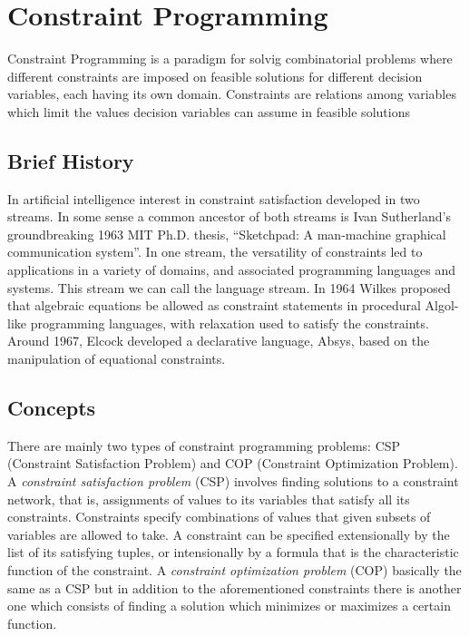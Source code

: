 \section{Constraint Programming}\label{sec:constraint_programming}

Constraint Programming is a paradigm for solvig combinatorial problems where
different constraints are imposed on feasible solutions for different decision variables, each having
its own domain. Constraints are relations among variables which limit the values decision variables
can assume in feasible solutions \cite{10.5555/2843512}

\subsection{Brief History}\label{subsec:brief_history}
In artificial intelligence interest in constraint satisfaction developed in two streams. In
some sense a common ancestor of both streams is Ivan Sutherland’s groundbreaking 1963
MIT Ph.D. thesis, “Sketchpad: A man-machine graphical communication system”.
In one stream, the versatility of constraints led to applications in a variety of domains,
and associated programming languages and systems. This stream we can call the language
stream. In 1964 Wilkes proposed that algebraic equations be allowed as constraint statements
in procedural Algol-like programming languages, with relaxation used to satisfy the
constraints. Around 1967, Elcock developed a declarative language, Absys, based on
the manipulation of equational constraints.

\subsection{Concepts}\label{subsec:concepts_cp}

There are mainly two types of constraint programming problems: CSP (Constraint Satisfaction Problem) and COP (Constraint Optimization Problem).\newline\newline
A \textit{constraint satisfaction problem} (CSP) involves finding solutions to a constraint network,
that is, assignments of values to its variables that satisfy all its constraints. Constraints
specify combinations of values that given subsets of variables are allowed to take.\newline
A constraint can be specified extensionally by the list of its satisfying tuples, or intensionally
by a formula that is the characteristic function of the constraint.\newline\newline
A \textit{constraint optimization problem} (COP) basically the same as a CSP but in addition to the aforementioned constraints there is another one
which consists of finding a solution which minimizes or maximizes a certain function.


